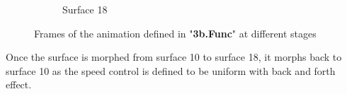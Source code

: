 \documentclass[acmlarge,nonacm=true]{acmart}
\begin{document}
\begin{figure}[H]
\begin{subfigure}{.33\textwidth}
		\caption{Surface 18}
	  \end{subfigure}
	\caption{Frames of the animation defined in "\textbf{3b.Func}" at different stages}
	\label{fig:2}
\end{figure}

Once the surface is morphed from surface 10 to surface 18, it morphs back to surface 10 as the 
speed control is defined to be uniform with back and forth effect.


\newpage
\end{document}
